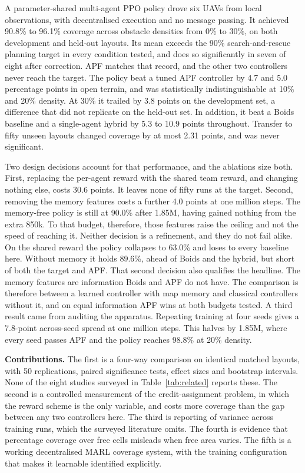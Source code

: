 \documentclass[a4paper, 10pt, conference]{ieeeconf}
\begin{document}
A parameter-shared multi-agent PPO policy drove six UAVs from local
observations, with decentralised execution and no message passing. It
achieved 90.8\% to 96.1\% coverage across obstacle densities from 0\%
to 30\%, on both development and held-out layouts. Its mean exceeds
the 90\% search-and-rescue planning target in every condition tested,
and does so significantly in seven of eight after correction. APF
matches that record, and the other two controllers never reach the
target. The policy beat a tuned APF controller by 4.7 and 5.0
percentage points in open terrain, and was statistically
indistinguishable at 10\% and 20\% density. At 30\% it trailed by 3.8
points on the development set, a difference that did not replicate on
the held-out set. In addition, it beat a Boids baseline and a
single-agent hybrid by 5.3 to 10.9 points throughout. Transfer to
fifty unseen layouts changed coverage by at most 2.31 points, and was
never significant.

Two design decisions account for that performance, and the ablations
size both. First, replacing the per-agent reward with the shared team
reward, and changing nothing else, costs 30.6 points. It leaves none
of fifty runs at the target. Second, removing the memory features
costs a further 4.0 points at one million steps. The memory-free
policy is still at 90.0\% after 1.85M, having gained nothing from the
extra 850k. To that budget, therefore, those features raise the
ceiling and not the speed of reaching it. Neither decision is a
refinement, and they do not fail alike. On the shared reward the
policy collapses to 63.0\% and loses to every baseline here. Without
memory it holds 89.6\%, ahead of Boids and the hybrid, but short of
both the target and APF. That second decision also qualifies the
headline. The memory features are information Boids and APF do not
have. The comparison is therefore between a learned controller with
map memory and classical controllers without it, and on equal
information APF wins at both budgets tested. A third result came from
auditing the apparatus. Repeating training at four seeds gives a
7.8-point across-seed spread at one million steps. This halves by
1.85M, where every seed passes APF and the policy reaches 98.8\% at
20\% density.

\textbf{Contributions.} The first is a four-way comparison on
identical matched layouts, with 50 replications, paired significance
tests, effect sizes and bootstrap intervals. None of the eight studies
surveyed in Table~\ref{tab:related} reports these. The second is a
controlled measurement of the credit-assignment problem, in which the
reward scheme is the only variable, and costs more coverage than the
gap between any two controllers here. The third is reporting of
variance across training runs, which the surveyed literature omits.
The fourth is evidence that percentage coverage over free cells
misleads when free area varies. The fifth is a working decentralised
MARL coverage system, with the training configuration that makes it
learnable identified explicitly.
\end{document}
